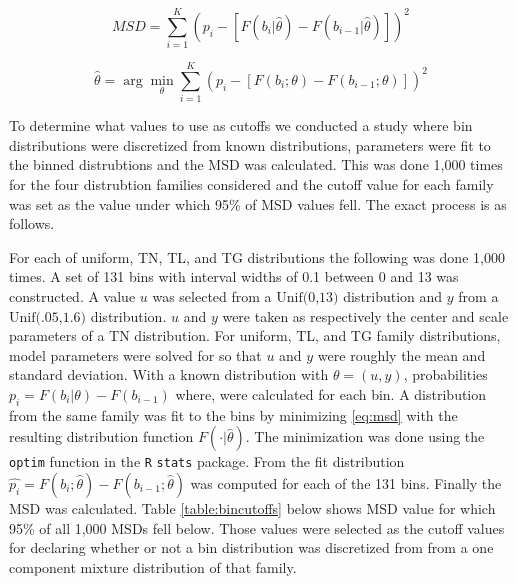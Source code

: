 \documentclass[11pt,notitlepage]{isuthesis}
\begin{document}
\begin{equation}
  MSD = \sum_{i=1}^K (p_i - [F(b_i| \hat{\theta}) - F(b_{i-1}| \hat{\theta})])^2
  \label{eq:msd}
\end{equation}


\begin{equation}
\hat{\theta} = \arg\min_{\theta}\sum_{i=1}^K (p_i - 
[F(b_i; \theta) - F(b_{i-1}; \theta)])^2
\label{eq:discfit}
\end{equation}




To determine what values to use as cutoffs we conducted a study where 
bin distributions were discretized from known distributions, 
parameters were fit to the binned distrubtions and the MSD was calculated. This 
was done 1,000 times for the four distrubtion families considered and the cutoff 
value for each family was set as the value under which 95\% of MSD values fell.
The exact process is as follows.

For each of uniform, TN, TL, and 
TG distributions the following was
done 1,000 times. A set of 131 bins with interval widths of 
0.1 between 0 and 13 was constructed. 
A value $u$ was selected from a $\mbox{Unif(0,13)}$ distribution and $y$ from 
a $\mbox{Unif(.05,1.6)}$ distribution. 
$u$ and $y$ were taken as respectively 
the center and scale parameters of a TN distribution. 
For uniform, TL, and TG family
distributions, model parameters were solved for so that $u$ and $y$ 
were roughly the mean and standard deviation.
With a known distribution with $\theta = (u,y)$, 
probabilities $p_i =F(b_i| \theta) - F(b_{i-1})$ 
where, were
calculated for each bin. A distribution from the same
family was fit to the bins by minimizing \eqref{eq:msd} with the resulting
distribution function $F(\cdot| \hat{\theta})$. 
The minimization was done using 
the \texttt{optim} function in the \texttt{R} \texttt{stats} package.
From the fit distribution
$\hat{p_i} = F(b_i; \hat{\theta}) - F(b_{i-1}; \hat{\theta})$ was computed for 
each of the 131 bins. Finally the MSD was calculated. 
Table \ref{table:bincutoffs}
below shows MSD value for which 95\% of all 1,000 MSDs fell below. Those values 
were selected as the 
cutoff values for declaring whether or not a bin distribution was discretized
from from a one component mixture distribution of that family.
\end{document}
